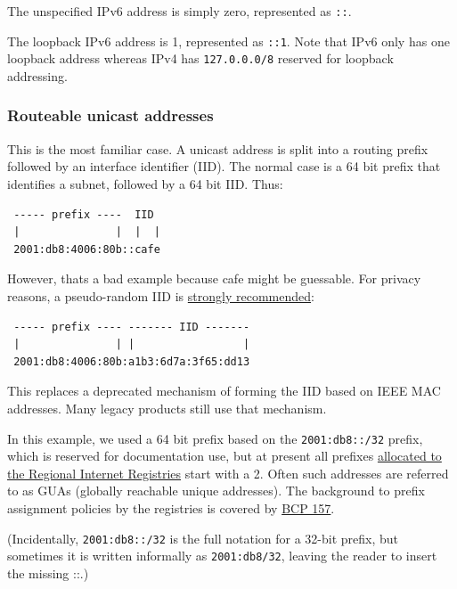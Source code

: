 \documentclass[
]{article}
\begin{document}
The unspecified IPv6 address is simply zero, represented as \texttt{::}.

The loopback IPv6 address is 1, represented as \texttt{::1}. Note that
IPv6 only has one loopback address whereas IPv4 has \texttt{127.0.0.0/8}
reserved for loopback addressing.

\subsubsection{Routeable unicast
addresses}\label{routeable-unicast-addresses}

This is the most familiar case. A unicast address is split into a
routing prefix followed by an interface identifier (IID). The normal
case is a 64 bit prefix that identifies a subnet, followed by a 64 bit
IID. Thus:

\begin{verbatim}
 ----- prefix ----  IID
 |               |  |  |
 2001:db8:4006:80b::cafe
\end{verbatim}

However, that\textquotesingle s a bad example because
\textquotesingle cafe\textquotesingle{} might be guessable. For privacy
reasons, a pseudo-random IID is
\href{https://www.rfc-editor.org/info/rfc8064}{strongly recommended}:

\begin{verbatim}
 ----- prefix ---- ------- IID -------
 |               | |                 |
 2001:db8:4006:80b:a1b3:6d7a:3f65:dd13
\end{verbatim}

This replaces a deprecated mechanism of forming the IID based on IEEE
MAC addresses. Many legacy products still use that mechanism.

In this example, we used a 64 bit prefix based on the
\texttt{2001:db8::/32} prefix, which is reserved for documentation use,
but at present all prefixes
\href{https://www.iana.org/assignments/ipv6-unicast-address-assignments/ipv6-unicast-address-assignments.xhtml}{allocated
to the Regional Internet Registries} start with a 2. Often such
addresses are referred to as GUAs (globally reachable unique addresses).
The background to prefix assignment policies by the registries is
covered by \href{https://www.rfc-editor.org/info/bcp157}{BCP 157}.

(Incidentally, \texttt{2001:db8::/32} is the full notation for a 32-bit
prefix, but sometimes it is written informally as \texttt{2001:db8/32},
leaving the reader to insert the missing
\textquotesingle::\textquotesingle.)
\end{document}
